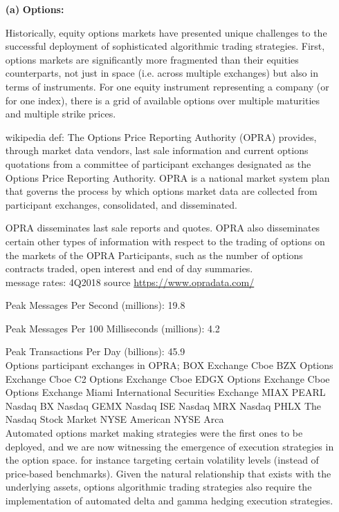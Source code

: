 \begin{enumerate}
\item[\textbf{(a)}] \textbf{Options:} 


Historically, equity options markets have presented unique challenges to the successful deployment of sophisticated algorithmic trading strategies. First, options markets are significantly more fragmented than their equities counterparts, not just in space (i.e. across multiple exchanges) but also in terms of instruments. For one equity instrument representing a company (or for one index), there is a grid of available options over multiple maturities and multiple strike prices.  

wikipedia def:
The Options Price Reporting Authority (OPRA) provides, through market data vendors, last sale information and current options quotations from a committee of participant exchanges designated as the Options Price Reporting Authority. OPRA is a national market system plan that governs the process by which options market data are collected from participant exchanges, consolidated, and disseminated.

OPRA disseminates last sale reports and quotes. OPRA also disseminates certain other types of information with respect to the trading of options on the markets of the OPRA Participants, such as the number of options contracts traded, open interest and end of day summaries. \\

message rates: 4Q2018 source \url{https://www.opradata.com/}

Peak Messages Per Second (millions): 19.8

Peak Messages Per 100 Milliseconds (millions): 4.2

Peak Transactions Per Day (billions): 45.9\\

Options participant exchanges in OPRA; 
BOX Exchange
Cboe BZX Options Exchange
Cboe C2 Options Exchange
Cboe EDGX Options Exchange
Cboe Options Exchange
Miami International Securities Exchange
MIAX PEARL
Nasdaq BX
Nasdaq GEMX
Nasdaq ISE
Nasdaq MRX
Nasdaq PHLX
The Nasdaq Stock Market
NYSE American
NYSE Arca \\


Automated options market making strategies were the first ones to be deployed, and we are now witnessing the emergence of execution strategies in the option space. for instance targeting certain volatility levels (instead of price-based benchmarks). Given the natural relationship that exists with the underlying assets, options algorithmic trading strategies also require the implementation of automated delta and gamma hedging execution strategies.



\end{enumerate}
